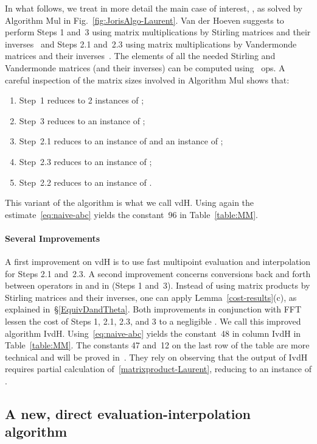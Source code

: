 \documentclass{sig-alt-full}
\begin{document}
In what follows, we treat in more detail  the main case of interest, , as solved by Algorithm \textsf{Mul} in Fig.~\ref{fig:JorisAlgo-Laurent}. 
Van der Hoeven suggests to perform Steps 1 and~3 using matrix multiplications by Stirling matrices and their inverses~\cite[\S5.1, Eqs.~(12--13)]{vdHoeven02} and Steps 2.1 and~2.3 using matrix multiplications by Vandermonde matrices and their inverses~\cite[\S2 and~\S4]{vdHoeven02}.
The elements of all the needed Stirling and Vandermonde matrices (and their inverses) can be computed using ~ops.
A careful inspection of the matrix sizes involved in Algorithm \textsf{Mul} shows that: 
 \begin{enumerate}
\item Step~1 reduces to 2 instances of ;
\item Step~3 reduces to an instance of ;
\item Step~2.1 reduces to an instance of  and an instance of ;
\item Step~2.3 reduces to an instance of ;
\item Step~2.2 reduces to an instance of .
 \end{enumerate}
This variant of the algorithm is what we call \textsf{vdH}.
Using again the estimate~\eqref{eq:naive-abc} yields the constant~96 in Table~\ref{table:MM}.



\paragraph*{Several Improvements} A first improvement on \textsf{vdH} 
is to use fast multipoint evaluation and interpolation for Steps 2.1 and~2.3.
A second improvement concerns conversions back and forth between operators in  and in  (Steps 1 and~3).
Instead of using matrix products by Stirling matrices and their inverses, one can apply Lemma~\ref{cost-results}(c),
as explained in~\S\ref{EquivDandTheta}.
Both improvements in conjunction with FFT lessen the cost of Steps 1, 2.1, 2.3, and 3 to a negligible .
We call this improved algorithm \textsf{IvdH}.
Using~\eqref{eq:naive-abc} yields the constant~48 in column \textsf{IvdH} in Table~\ref{table:MM}.
The constants 47 and~12 on the last row of the table are more technical and will be proved in~\cite{LongVersion}.
They rely on observing that the output of \textsf{IvdH} requires partial calculation of~\eqref{matrixproduct-Laurent}, reducing to an instance of .



\subsection{A new, direct evaluation-interpolation algorithm}
\label{sec:MulWeyl}
\end{document}
